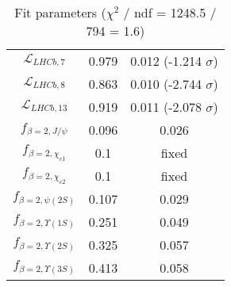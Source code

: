 \begin{table}[h!]
\begin{tabular}{c|c|c}
$\mathcal L_{LHCb,7}$ & 0.979 & 0.012 (-1.214 $\sigma$) \\
$\mathcal L_{LHCb,8}$ & 0.863 & 0.010 (-2.744 $\sigma$) \\
$\mathcal L_{LHCb,13}$ & 0.919 & 0.011 (-2.078 $\sigma$) \\
$f_{\beta=2,J/\psi}$ & 0.096 & 0.026 \\
$f_{\beta=2,\chi_{c1}}$ & 0.1 & fixed \\
$f_{\beta=2,\chi_{c2}}$ & 0.1 & fixed \\
$f_{\beta=2,\psi(2S)}$ & 0.107 & 0.029 \\
$f_{\beta=2,\Upsilon(1S)}$ & 0.251 & 0.049 \\
$f_{\beta=2,\Upsilon(2S)}$ & 0.325 & 0.057 \\
$f_{\beta=2,\Upsilon(3S)}$ & 0.413 & 0.058 \\
\end{tabular}
\caption{Fit parameters ($\chi^2$ / ndf = 1248.5 / 794 = 1.6)}
\end{table}
